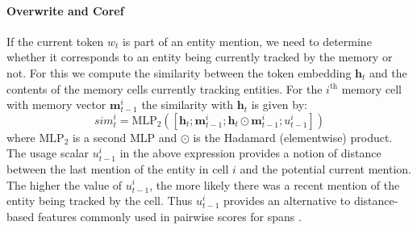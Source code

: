 \documentclass[11pt,a4paper]{article}
\newcommand{\mysim}{\mathit{sim}}
\newcommand{\mlp}{\mathrm{MLP}}
\def\vec#1{\ensuremath{\boldsymbol{{#1}}}}
\begin{document}
\paragraph{Overwrite and Coref}
If the current token $w_t$ is part of an entity mention, we need to determine whether it corresponds to an entity being currently tracked by the memory or not.
For this we compute the similarity between the token embedding $\vec{h}_t$ and the contents of the memory cells currently tracking entities.
For the $i^\textrm{th}$ memory cell with memory vector $\vec{m}_{t-1}^i$ the similarity with $\vec{h}_t$ is given by:\begin{equation} \label{sim_eqn}
\mysim_{t}^{i} = \mlp_2([\vec{h}_t; \vec{m}_{t-1}^{i};
                \vec{h}_t \odot \vec{m}_{t-1}^{i}; u_{t-1}^i])
\end{equation}
where $\mlp_2$ is a second MLP and $\odot$ is the Hadamard (elementwise) product.
The usage scalar $u_{t-1}^i$ in the above expression provides a notion of distance between the last mention of the entity in cell $i$ and the potential current mention.
The higher the value of $u_{t-1}^i$, the more likely
there was a recent mention of the entity being tracked by the cell.
Thus $u_{t-1}^i$ provides an alternative to distance-based features commonly used in pairwise scores for spans
\citep{lee-etal-2017-end}.
\end{document}

